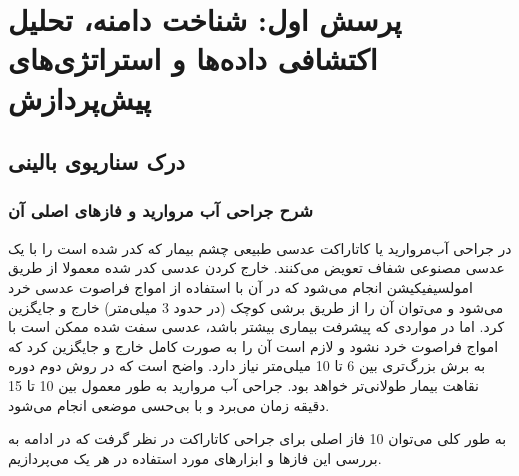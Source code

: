 \documentclass{article}
\begin{document}


\tableofcontents \clearpage
\listoffigures \clearpage
\listoftables \clearpage
\lstlistoflistings \clearpage
\newpage
\section{پرسش اول: شناخت دامنه، تحلیل اکتشافی داده‌ها  و استراتژی‌های پیش‌پردازش}
\subsection{درک سناریوی بالینی}

\subsubsection{شرح جراحی آب مروارید و فازهای اصلی آن}

در جراحی آب‌مروارید یا کاتاراکت  عدسی طبیعی چشم بیمار که کدر شده است را با یک عدسی مصنوعی شفاف تعویض می‌کنند. خارج کردن عدسی کدر شده معمولا از طریق امولسیفیکیشن  انجام می‌شود که در آن با استفاده از امواج فراصوت عدسی خرد می‌شود و می‌توان آن را از طریق برشی کوچک (در حدود 3 میلی‌متر) خارج و جایگزین کرد. اما در مواردی که پیشرفت بیماری بیشتر باشد، عدسی سفت شده ممکن است با امواج فراصوت خرد نشود و لازم است آن را به صورت کامل خارج و جایگزین کرد که به برش بزرگ‌تری بین 6 تا 10 میلی‌متر نیاز دارد. واضح است که در روش دوم دوره نقاهت بیمار طولانی‌تر خواهد بود. جراحی آب مروارید به طور معمول بین 10 تا 15 دقیقه زمان می‌برد و با بی‌حسی موضعی انجام می‌شود. 

به طور کلی می‌توان 10 فاز اصلی برای جراحی کاتاراکت در نظر گرفت که در ادامه به بررسی این فازها و ابزارهای مورد استفاده در هر یک می‌پردازیم.
\end{document}
